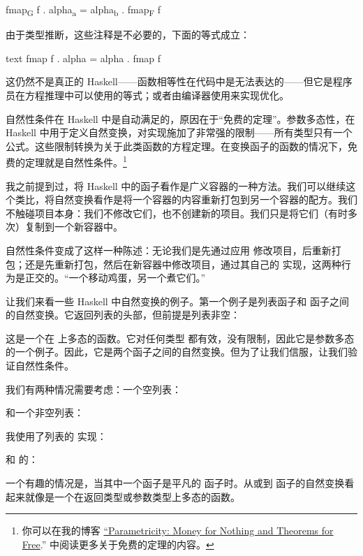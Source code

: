\begin{snipv}
  fmap\textsubscript{G} f . alpha\textsubscript{a} = alpha\textsubscript{b} . fmap\textsubscript{F} f
\end{snipv}
由于类型推断，这些注释是不必要的，下面的等式成立：

\begin{snip}{text}
  fmap f . alpha = alpha . fmap f
\end{snip}
这仍然不是真正的 Haskell——函数相等性在代码中是无法表达的——但它是程序员在方程推理中可以使用的等式；或者由编译器使用来实现优化。

自然性条件在 Haskell 中是自动满足的，原因在于“免费的定理”。参数多态性，在 Haskell 中用于定义自然变换，对实现施加了非常强的限制——所有类型只有一个公式。这些限制转换为关于此类函数的方程定理。在变换函子的函数的情况下，免费的定理就是自然性条件。\footnote{
  你可以在我的博客 \href{https://bartoszmilewski.com/2014/09/22/parametricity-money-for-nothing-and-theorems-for-free/}{``Parametricity:
  Money for Nothing and Theorems for Free}.'' 中阅读更多关于免费的定理的内容。}

我之前提到过，将 Haskell 中的函子看作是广义容器的一种方法。我们可以继续这个类比，将自然变换看作是将一个容器的内容重新打包到另一个容器的配方。我们不触碰项目本身：我们不修改它们，也不创建新的项目。我们只是将它们（有时多次）复制到一个新容器中。

自然性条件变成了这样一种陈述：无论我们是先通过应用  修改项目，后重新打包；还是先重新打包，然后在新容器中修改项目，通过其自己的  实现，这两种行为是正交的。“一个移动鸡蛋，另一个煮它们。”

让我们来看一些 Haskell 中自然变换的例子。第一个例子是列表函子和  函子之间的自然变换。它返回列表的头部，但前提是列表非空：

这是一个在  上多态的函数。它对任何类型  都有效，没有限制，因此它是参数多态的一个例子。因此，它是两个函子之间的自然变换。但为了让我们信服，让我们验证自然性条件。

我们有两种情况需要考虑：一个空列表：


和一个非空列表：


我使用了列表的  实现：

和  的：

一个有趣的情况是，当其中一个函子是平凡的  函子时。从或到  函子的自然变换看起来就像是一个在返回类型或参数类型上多态的函数。

